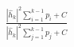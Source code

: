 \documentclass[preview]{standalone}
\begin{document}
\begin{align*}
\frac{\left|{\hat{h}_k}\right|^2\sum_{i=1}^{k-1}p_i+ C}{\left|{\hat{h}_k}\right|^2\sum_{j=1}^{k-1}p_j+ C}
\end{align*}
\end{document}
